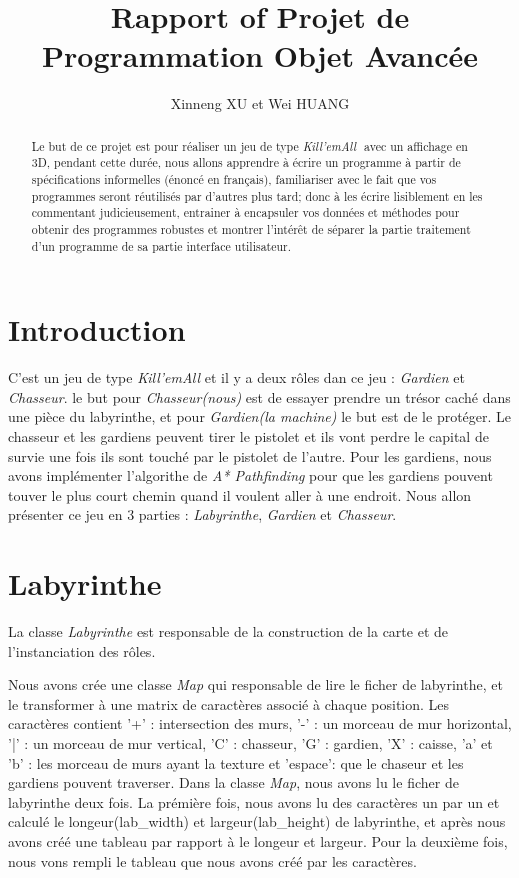 \documentclass{article}
\title{Rapport of Projet de Programmation Objet Avancée}
\author{Xinneng XU et Wei HUANG}
\begin{document}
\maketitle

\begin{abstract}
\label{abstract}
Le but de ce projet est pour réaliser un jeu de type ​\textsl{Kill'emAll}  ​ avec un affichage en 3D, pendant cette durée, nous allons apprendre à écrire un programme à partir de spécifications informelles (énoncé en français), familiariser avec le fait que vos programmes seront réutilisés par d'autres plus tard; donc à les écrire lisiblement en les commentant judicieusement, entrainer à encapsuler vos données et méthodes pour obtenir des programmes robustes et  montrer l'intérêt de séparer la partie traitement d'un programme de sa partie interface utilisateur.
\end{abstract}


\section{Introduction}
C'est un jeu de type ​\textsl{Kill'emAll} et il y a deux rôles dan ce jeu : \textsl{Gardien} et \textsl{Chasseur}.  le but pour \textsl{Chasseur(nous)} est de essayer prendre un trésor caché dans une pièce du labyrinthe, et pour \textsl{Gardien(la machine)} le but est de le protéger. Le chasseur et les gardiens peuvent tirer le pistolet et ils vont perdre le capital de survie une fois ils sont touché par le pistolet de l'autre. Pour les gardiens, nous avons implémenter l'algorithe de \textsl{A* Pathfinding} pour que les gardiens pouvent touver le plus court chemin quand il voulent aller à une endroit. Nous allon présenter ce jeu en 3 parties : \textsl{Labyrinthe}, \textsl{Gardien} et \textsl{Chasseur}.

\section{Labyrinthe}
La classe \textsl{Labyrinthe} est responsable de la construction de la carte et de l'instanciation des rôles. 

Nous avons crée une classe \textsl{Map} qui responsable de lire le ficher de labyrinthe, et le transformer à une matrix de caractères associé à chaque position. Les caractères contient  '+' : intersection des murs,  '-' :  un morceau de mur horizontal, '|' :   un morceau de mur vertical,  'C' : chasseur,  'G' : gardien,   'X' :  caisse, 'a' et 'b' : les morceau de murs ayant la texture et 'espace': que le chaseur et les gardiens pouvent traverser. Dans la classe \textsl{Map}, nous avons lu le ficher de labyrinthe deux fois. La prémière fois, nous avons lu des caractères un par un et calculé le longeur(lab\_width) et largeur(lab\_height) de labyrinthe, et après nous avons créé une tableau par rapport à le longeur et largeur. Pour la deuxième fois, nous vons rempli le tableau   que nous avons créé par les caractères.
\end{document}
